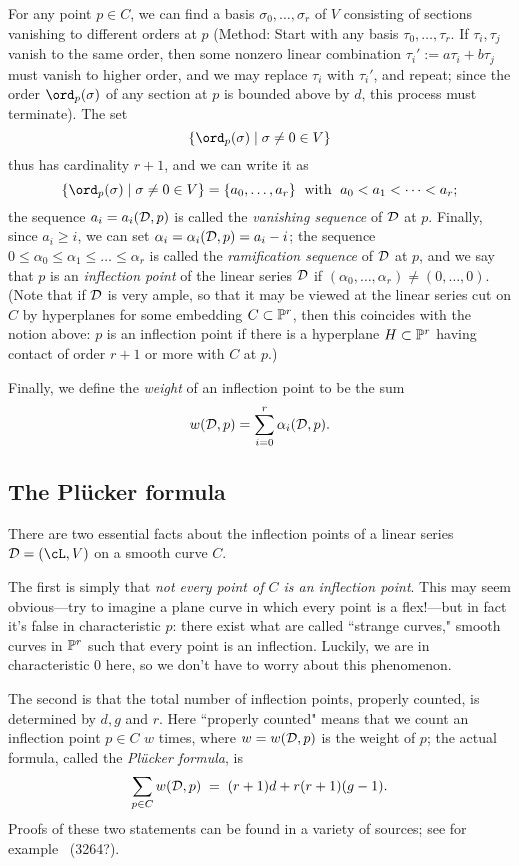 For any point $p \in C$, we can find a basis $\sigma_0, \dots, \sigma_r$ of $V$ consisting of sections vanishing to different orders at $p$ (Method: Start with any basis $\tau_0, \dots, \tau_r$. If  $\tau_i, \tau_j$ vanish to the same order, then some nonzero linear combination $\tau_i' := a\tau_i+b\tau_j$ must vanish to higher order, and we may replace $\tau_i$ with $\tau_i'$, and repeat; since the order $\ord_p(\sigma)$ of any section at $p$ is bounded above by $d$, this process must terminate). The set
$$
\{ \ord_p(\sigma) \mid \sigma \neq 0 \in V \}
$$
thus has cardinality $r+1$, and we can write it as
$$
\{ \ord_p(\sigma) \mid \sigma \neq 0 \in V \} = \{a_0,\dots,a_r\} \; \text{ with } \; a_0 < a_1 < \dots < a_r;
$$
the sequence $a_i = a_i(\cD,p)$ is called the \emph{vanishing sequence} of $\cD$ at $p$.  Finally, since $a_i \geq i$, we can set $\alpha_i = \alpha_i(\cD,p) = a_i - i$; the sequence $0 \leq \alpha_0 \leq \alpha_1 \leq \dots \leq \alpha_r$ is called the \emph{ramification sequence} of $\cD$ at $p$, and we say that $p$ is an \emph{inflection point} of the linear series $\cD$ if $(\alpha_0,\dots,\alpha_r) \neq (0,\dots,0)$. (Note that if $\cD$ is very ample, so that it may be viewed at the linear series cut on $C$ by hyperplanes for some embedding $C \subset \PP^r$, then this coincides with the notion above: $p$ is an inflection point if there is a hyperplane $H \subset \PP^r$ having contact of order $r+1$ or more with $C$ at $p$.)

Finally, we define the \emph{weight} of an inflection point to be the sum
$$
w(\cD, p) = \sum_{i=0}^r \alpha_i(\cD, p).
$$

\subsection{The Pl\"ucker formula}

There are two essential facts about the inflection points of a linear series $\cD = (\cL,V)$ on a smooth curve $C$.

The first is simply that \emph{not every point of $C$ is an inflection point}. This may seem obvious---try to imagine a plane curve in which every point is a flex!---but in fact it's false in characteristic $p$: there exist what are called ``strange curves," smooth curves in $\PP^r$ such that every point is an inflection. Luckily, we are in characteristic 0 here, so we don't have to worry about this phenomenon.

The second is that the total number of inflection points, properly counted, is determined by $d, g$ and $r$. Here ``properly counted" means that we count an inflection point $p \in C$ $w$ times, where $w = w(\cD,p)$ is the weight of $p$; the actual formula, called the \emph{Pl\"ucker formula}, is
\begin{equation}\label{Plucker formula}
\sum_{p \in C} w(\cD, p) \; = \; (r+1)d + r(r+1)(g-1).
\end{equation}
Proofs of these two statements can be found in a variety of sources; see for example~\cite{} (3264?). 

